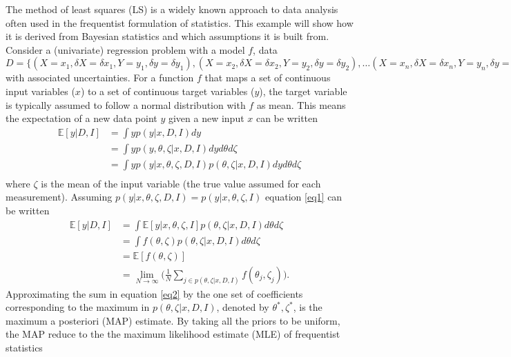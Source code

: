 \begin{example}
	\label{ex:LS}
	The method of least squares (LS) is a widely known approach to data analysis often used in the frequentist formulation of statistics. This example will show how it is derived from Bayesian statistics and which assumptions it is built from. Consider a (univariate) regression problem with a model $f$, data $D = \{(X=x_1, \delta X = \delta x_1, Y=y_1, \delta y = \delta y_1), (X=x_2, \delta X = \delta x_2, Y=y_2, \delta y = \delta y_2),\dots (X=x_n, \delta X = \delta x_n, Y=y_n, \delta y = \delta y_n)\}$ with associated uncertainties. For a function $f$ that maps a set of continuous input variables ($x$) to a set of continuous target variables ($y$), the target variable is typically assumed to follow a normal distribution with $f$ as mean. This means the expectation of a new data point $y$ given a new input $x$ can be written
	\begin{equation}
		\begin{split}
			\mathbb{E}[y|D,I] &= \int y p(y|x,D,I)d y\\
			&= \int y p(y,\theta,\zeta|x,D,I)d yd\theta d\zeta\\
			&= \int y p(y|x,\theta,\zeta,D,I)p(\theta,\zeta|x,D,I)d yd\theta d\zeta\\
		\end{split}
		\label{eq1}
	\end{equation}
	where $\zeta$ is the mean of the input variable (the true value assumed for each measurement). Assuming $p(y|x,\theta,\zeta,D,I) = p(y|x,\theta,\zeta,I)$ equation \eqref{eq1} can be written
	\begin{equation}
		\begin{split}
			\mathbb{E}[y|D,I]&= \int \mathbb{E}[y|x,\theta,\zeta,I]p(\theta,\zeta|x,D,I)d\theta d\zeta\\
			&= \int f(\theta,\zeta)p(\theta,\zeta|x,D,I)d\theta d\zeta\\
			&= \mathbb{E}[f(\theta,\zeta)]\\
			&=\lim\limits_{N\rightarrow \infty}\bigg(\frac{1}{N}\sum_{j\in p(\theta,\zeta|x,D,I)}f(\theta_j,\zeta_j)\bigg).
		\end{split}
		\label{eq2}
	\end{equation}
	Approximating the sum in equation \eqref{eq2} by the one set of coefficients corresponding to the maximum in $p(\theta,\zeta|x,D,I)$, denoted by $\theta^*,\zeta^*$, is the maximum a posteriori (MAP) estimate. By taking all the priors to be uniform, the MAP reduce to the the maximum likelihood estimate (MLE) of frequentist statistics

\end{example}
